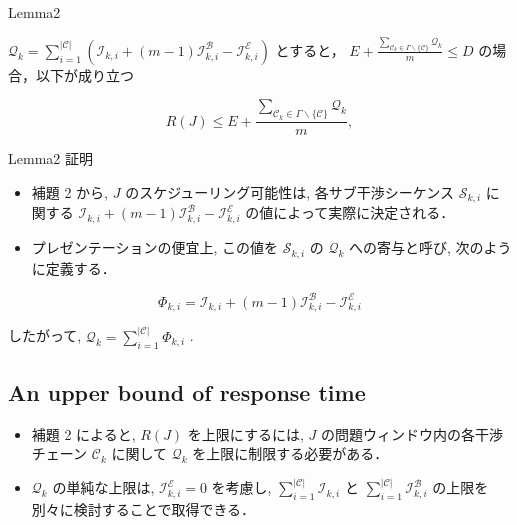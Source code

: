 \begin{frame}{Lemma2}
    \begin{lemma}[]
        $\mathcal{Q}_{k}=\sum_{i=1}^{|\mathcal{C}|}\left(\mathcal{I}_{k, i}+(m-1) \mathcal{I}_{k, i}^{\mathcal{B}}-\mathcal{I}_{k, i}^{\mathcal{E}}\right)$ とすると，
        $E+\frac{\sum_{\mathcal{C}_{k} \in \Gamma \backslash\{\mathcal{C}\}} \mathcal{Q}_{k}}{m} \leq D$ の場合，以下が成り立つ

        \begin{equation*}
            R(J) \leq E+\frac{\sum_{\mathcal{C}_{k} \in \Gamma \backslash\{\mathcal{C}\}} \mathcal{Q}_{k}}{m},
        \end{equation*}
    \end{lemma}
\end{frame}

\begin{frame}{Lemma2 証明}
    \todo{}
\end{frame}

\begin{frame}{}
    \begin{itemize}
        \item 補題 2 から, $J$ のスケジューリング可能性は, 各サブ干渉シーケンス $\mathcal{S}_{k, i}$ に関する $\mathcal{I}_{k, i}+(m-1) \mathcal{I}_{k, i}^{\mathcal{B}}-\mathcal{I}_{k, i}^{\mathcal{E}}$ の値によって実際に決定される．
        \item プレゼンテーションの便宜上, この値を $\mathcal{S}_{k, i}$ の $\mathcal{Q}_{k}$ への寄与と呼び, 次のように定義する．

    \end{itemize}
              \begin{equation*}
                  \Phi_{k, i}=\mathcal{I}_{k, i}+(m-1) \mathcal{I}_{k, i}^{\mathcal{B}}-\mathcal{I}_{k, i}^{\mathcal{E}}
              \end{equation*}

              したがって, $\mathcal{Q}_{k}=\sum_{i=1}^{|\mathcal{C}|} \Phi_{k, i}$ .
\end{frame}


\subsection{An upper bound of response time}
\label{ssec: an_upper_bound_of_response_time}

\begin{frame}{}
    \begin{itemize}
        \item 補題 2 によると, $R(J)$ を上限にするには, $J$ の問題ウィンドウ内の各干渉チェーン $\mathcal{C}_{k}$ に関して $\mathcal{Q}_{k}$ を上限に制限する必要がある．
        \item $\mathcal{Q}_{k}$ の単純な上限は, $\mathcal{I}_{k, i}^{\mathcal{E}}=0$ を考慮し, $\sum_{i=1}^{|\mathcal{C}|} \mathcal{I}_{k, i}$ と $\sum_{i=1}^{|\mathcal{C}|} \mathcal{I}_{k, i}^{\mathcal{B}}$ の上限を別々に検討することで取得できる．
    \end{itemize}
\end{frame}

